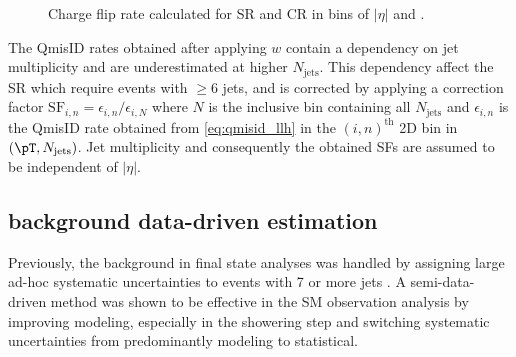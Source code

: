 \documentclass[../thesis.tex]{subfiles}
\begin{document}
\begin{figure}[!htb]
\centering
{}
\caption{\label{fig:ana:qmisid}Charge flip rate calculated for \acs{SR} and \acs{CR} \ttW in bins of $|\eta|$ and \pT.}
\end{figure}

The \acs{QmisID} rates obtained after applying $w$ contain a dependency on jet multiplicity and are underestimated at higher $N_\text{jets}$. This dependency affect the \acs{SR} which require events with $\geq 6$ jets, and is corrected by applying a correction factor $\text{SF}_{i,n} = \epsilon_{i,n}/\epsilon_{i,N}$ where $N$ is the inclusive bin containing all $N_\text{jets}$ and $\epsilon_{i,n}$ is the \acs{QmisID} rate obtained from \autoref{eq:qmisid_llh} in the $(i,n)^\text{th}$ 2D bin in $(\pT, N_\text{jets})$. Jet multiplicity and consequently the obtained \acs{SF}s are assumed to be independent of $|\eta|$.




\subsection{\ttW background data-driven estimation}
\label{sec:ttW_BG}
Previously, the \ttW background in \tttt final state analyses was handled by assigning large ad-hoc systematic uncertainties to \ttW events with 7 or more jets \citep{tttt_evidence}. A semi-data-driven method \citep{ana:r_par_susy_2021} was shown to be effective in the SM \tttt observation analysis \citep{tttt_obs} by improving \ttW modeling, especially in the showering step and switching \ttW systematic uncertainties from predominantly modeling to statistical.
\end{document}

